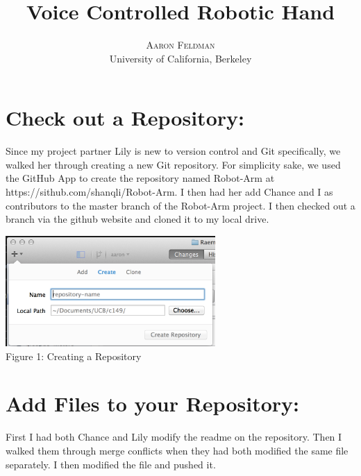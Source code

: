 \documentclass[twoside]{article}
\title{\vspace{-15mm}\fontsize{24pt}{10pt}\selectfont\textbf{Voice Controlled Robotic Hand}} %
\author{
\large
\textsc{Aaron Feldman}\\[2mm] %
\normalsize University of California, Berkeley \\ %
\vspace{-5mm}
}
\date{}
\begin{document}
\maketitle %

\thispagestyle{fancy} %


%


\section{Check out a Repository:}
Since my project partner Lily is new to version control and Git specifically, we walked her through creating a new Git repository. For simplicity sake, we used the GitHub App to create the repository named Robot-Arm at https://sithub.com/shanqli/Robot-Arm. I then had her add Chance and I as contributors to the master branch of the Robot-Arm project. I then checked out a branch via the github website and cloned it to my local drive.
\begin{center}
\includegraphics*[width = 8cm]{Fig1.png}\\
Figure 1: Creating a Repository
\end{center}






\section{Add Files to your Repository:}
First I had both Chance and Lily modify the readme on the repository. Then I walked them through merge conflicts when they had both modified the same file separately. I then modified the file and pushed it.
\end{document}

